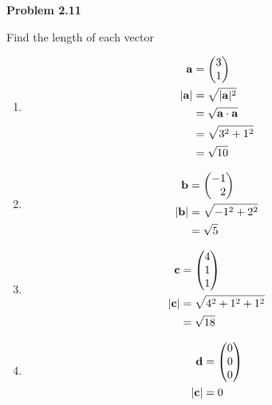 \documentclass[12pt]{article}
\newenvironment{problem}[1][default]{
  \begin{framed}\begin{minipage}{0.97\textwidth}
  \setlength{\parskip}{4mm}
  {\bf Problem #1}
}{\end{minipage}\end{framed}}
\newenvironment{abc}{\begin{enumerate}[label={\bf(\alph*)}]}{\end{enumerate}}
\newcommand\m[2][]{
	\ifthenelse{\equal {#1} {}}
		{\begin{pmatrix*}[r]#2\end{pmatrix*}}
		{\left(\begin{array}{#1}#2\end{array}\right)}
}
\newcommand\magnitude[1]{
	\lvert{#1}\rvert
}
\renewcommand{\vec}[1]{\mathbf{#1}}
\begin{document}
\begin{problem}[2.11]
	Find the length of each vector
\end{problem}

\begin{abc}
\item{
	\begin{equation*}
	\begin{aligned}
		\vec{a} &= \m{3 \\ 1} \\
		\magnitude{\vec{a}} &= \sqrt{\magnitude{\vec{a}}^2} \\
		                    &= \sqrt{\vec{a} \cdot \vec{a}} \\
		                    &= \sqrt{3^2 + 1 ^2} \\
		                    &= \sqrt{10}
	\end{aligned}
	\end{equation*}
}

\item{
	\begin{equation*}
	\begin{aligned}
		\vec{b} &= \m{-1 \\ 2} \\
		\magnitude{\vec{b}} &= \sqrt{-1^2 + 2^2} \\
		                    &= \sqrt{5}
	\end{aligned}
	\end{equation*}
}

\item{
	\begin{equation*}
	\begin{aligned}
		\vec{c} &= \m{4 \\ 1 \\ 1} \\
		\magnitude{\vec{c}} &= \sqrt{4^2 + 1^2 + 1^2} \\
		                    &= \sqrt{18}
	\end{aligned}
	\end{equation*}
}

\item{
	\begin{equation*}
	\begin{aligned}
		\vec{d} &= \m{0 \\ 0 \\ 0} \\
		\magnitude{\vec{c}} &= 0
	\end{aligned}
	\end{equation*}
}
\end{abc}
\end{document}
